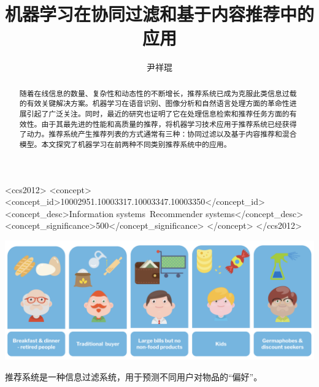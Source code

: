 \documentclass[sigconf]{acmart}
\begin{document}
\title{机器学习在协同过滤和基于内容推荐中的应用}


\author{尹祥琨}
\affiliation
{
}

\begin{abstract}
  随着在线信息的数量、复杂性和动态性的不断增长，推荐系统已成为克服此类信息过载的有效关键解决方案。机器学习在语音识别、图像分析和自然语言处理方面的革命性进展引起了广泛关注。同时，最近的研究也证明了它在处理信息检索和推荐任务方面的有效性。由于其最先进的性能和高质量的推荐，将机器学习技术应用于推荐系统已经获得了动力。推荐系统产生推荐列表的方式通常有三种：协同过滤以及基于内容推荐和混合模型。本文探究了机器学习在前两种不同类别推荐系统中的应用。
\end{abstract}

\begin{CCSXML}
  <ccs2012>
     <concept>
         <concept_id>10002951.10003317.10003347.10003350</concept_id>
         <concept_desc>Information systems~Recommender systems</concept_desc>
         <concept_significance>500</concept_significance>
         </concept>
   </ccs2012>
\end{CCSXML}
  



\begin{teaserfigure}
  \includegraphics[width=\textwidth]{img/teaser.png}
  \caption{推荐系统是一种信息过滤系统，用于预测不同用户对物品的“偏好”。}
  \label{fig:teaser}
\end{teaserfigure}
\end{document}
